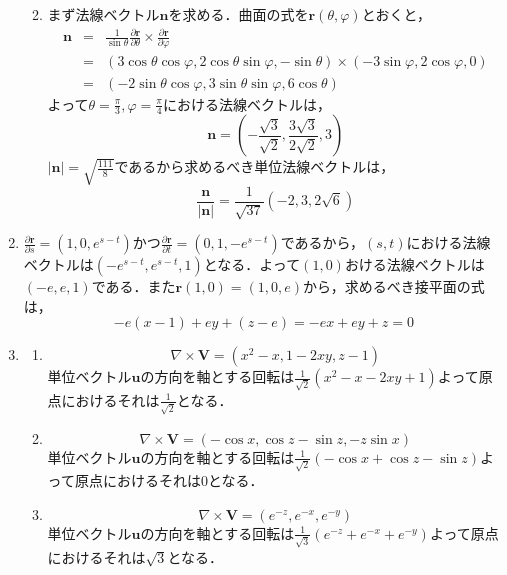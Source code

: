 \documentclass{jarticle}
\begin{document}
\begin{enumerate}
\begin{enumerate}
     \vspace{150pt}
        \item
          まず法線ベクトル${\bm n}$を求める．曲面の式を${\bm r}(\theta,\varphi)$とおくと，
          \begin{eqnarray*}
          {\bm n} & = & \frac{1}{\sin\theta}\frac{\partial {\bm r}}{\partial \theta} \times \frac{\partial \bm r}{\partial \varphi} \\ 
          & = & (3\cos\theta\cos\varphi,2\cos\theta\sin\varphi,-\sin\theta) \times (-3\sin\varphi,2\cos\varphi,0) \\
          & = & (-2\sin\theta\cos\varphi,3\sin\theta\sin\varphi,6\cos\theta)
          \end{eqnarray*}
          よって$\theta=\frac{\pi}{3},\varphi=\frac{\pi}{4}$における法線ベクトルは，
          \[ \bm n = (-\frac{\sqrt{3}}{\sqrt{2}},\frac{3\sqrt{3}}{2\sqrt{2}},3) \]
          $|\bm n| = \sqrt{\frac{111}{8}}$であるから求めるべき単位法線ベクトルは，
          \[ \frac{\bm n}{|\bm n|} = \frac{1}{\sqrt{37}} (-2,3,2\sqrt{6})\]
      \end{enumerate}
    \item
      $\frac{\partial \bm r}{\partial s} = (1,0,e^{s-t})$かつ$\frac{\partial \bm r}{\partial t} = (0,1,-e^{s-t})$であるから，$(s,t)$における法線ベクトルは$(-e^{s-t},e^{s-t},1)$となる．よって$(1,0)$おける法線ベクトルは$(-e,e,1)$である．また${\bm r}(1,0) = (1,0,e)$から，求めるべき接平面の式は，
      \[ -e(x-1)+ey+(z-e)=-ex+ey+z=0 \]
    \item
      \begin{enumerate}
        \item
          \[\nabla \times {\bm V} = (x^2-x,1-2xy,z-1)\]
          単位ベクトル$\bm u$の方向を軸とする回転は$\frac{1}{\sqrt 2}( x^2-x -2xy+1)$よって原点におけるそれは$\frac{1}{\sqrt{2}}$となる．
        \item
          \[\nabla \times {\bm V} = (-\cos x, \cos z - \sin z, -z\sin x)\]
          単位ベクトル$\bm u$の方向を軸とする回転は$\frac{1}{\sqrt 2}( -\cos x+\cos z -\sin z)$よって原点におけるそれは$0$となる．
        \item
          \[\nabla \times {\bm V} = (e^{-z},e^{-x},e^{-y})\]
          単位ベクトル$\bm u$の方向を軸とする回転は$\frac{1}{\sqrt 3}(e^{-z}+e^{-x}+e^{-y})$よって原点におけるそれは$\sqrt{3}$となる．

\end{enumerate}
\end{enumerate}
\end{document}
